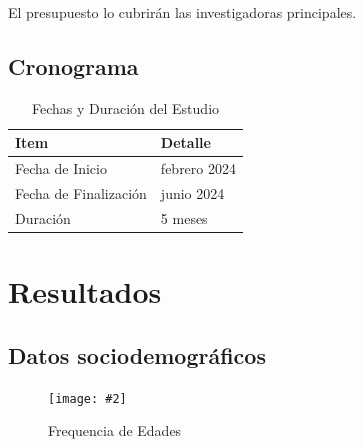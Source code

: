 \documentclass[jou]{apa7}
\newcommand{\includegraphicsmax}[2][]{%
	\texttt{[image: \#2]}%
}
\begin{document}
	El presupuesto lo cubrirán las investigadoras principales.

	\subsection{Cronograma}\label{cronograma}

	\begin{table}[h!]
		\centering
		\begin{tabular}{@{}ll@{}}
			\toprule
			\textbf{Item}                & \textbf{Detalle}     \\ \midrule
			Fecha de Inicio              & febrero 2024         \\
			Fecha de Finalización        & junio 2024           \\
			Duración                     & 5 meses              \\ \bottomrule
		\end{tabular}
		\caption{Fechas y Duración del Estudio}
		\label{tab:fechas-duracion}
	\end{table}


	\section{Resultados}\label{resultados}

	\subsection{Datos sociodemográficos}

	\begin{figure}[H]
		\centering
		\includegraphicsmax{freq.age.pdf}
		\caption{Frequencia de Edades}
		\label{fig:Figure1}
	\end{figure}
\end{document}
